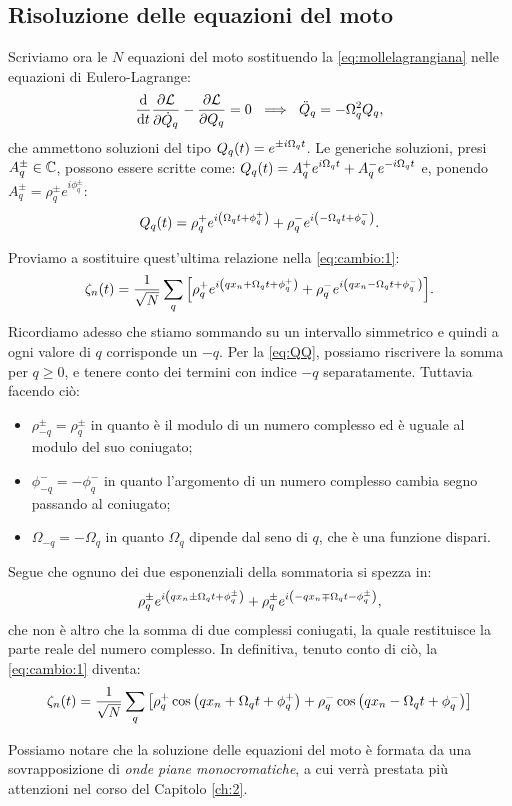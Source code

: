     \subsection{Risoluzione delle equazioni del moto}
        Scriviamo ora le $N$ equazioni del moto sostituendo la \eqref{eq:mollelagrangiana} nelle equazioni di Eulero-Lagrange:
            $$\lagrange{\LL}{Q_q}{\dot{Q}_q}=0\ \implies\ \ddot{Q}_q=-\Omega_q^2Q_q,$$
        che ammettono soluzioni del tipo $\displaystyle Q_q\qty(t)=e^{\pm i\Omega_qt}$. Le generiche soluzioni, presi $A_q^\pm\in\mathbb{C}$, possono essere scritte come: $\displaystyle Q_q\qty(t)=A_q^+e^{i\Omega_qt}+A_q^-e^{-i\Omega_qt}$ e, ponendo $\displaystyle A_q^\pm=\rho_q^\pm e^{i\phi_q^\pm}$:
            $$Q_q\qty(t)=\rho_q^+e^{i\qty(\Omega_qt+\phi_q^+)}+\rho_q^-e^{i\qty(-\Omega_qt+\phi_q^-)}.$$
        \par Proviamo a sostituire quest'ultima relazione nella \eqref{eq:cambio:1}:
            $$\zeta_n\qty(t)=\frac{1}{\sqrt{N}}\sum_q\qty[\rho_q^+e^{i\qty(qx_n+\Omega_qt+\phi_q^+)}+\rho_q^-e^{i\qty(qx_n-\Omega_qt+\phi_q^-)}].$$
        Ricordiamo adesso che stiamo sommando su un intervallo simmetrico e quindi a ogni valore di $q$ corrisponde un $-q$. Per la \eqref{eq:QQ}, possiamo riscrivere la somma per $q\geq 0$, e tenere conto dei termini con indice $-q$ separatamente. Tuttavia facendo ci\`o: 
        \begin{itemize}
            \item $\rho_{-q}^\pm=\rho_{q}^\pm$ in quanto \`e il modulo di un numero complesso ed \`e uguale al modulo del suo coniugato;
            \item $\phi_{-q}^-=-\phi_q^-$ in quanto l'argomento di un numero complesso cambia segno passando al coniugato;
            \item $\Omega_{-q}=-\Omega_q$ in quanto $\Omega_q$ dipende dal seno di $q$, che \`e una funzione dispari.
        \end{itemize}
        Segue che ognuno dei due esponenziali della sommatoria si spezza in:
            $$\rho_q^\pm e^{i\qty(qx_n\pm\Omega_qt+\phi_q^\pm)}+\rho_{q}^\pm e^{i\qty(-qx_n\mp\Omega_qt-\phi_{q}^\pm)},$$
        che non \`e altro che la somma di due complessi coniugati, la quale restituisce la parte reale del numero complesso. In definitiva, tenuto conto di ci\`o, la \eqref{eq:cambio:1} diventa:
        \begin{equation}
            \zeta_n\qty(t)=\frac{1}{\sqrt{N}}\sum_q\qty[\rho_q^+\cos\qty(qx_n+\Omega_qt+\phi_q^+)+\rho_q^-\cos\qty(qx_n-\Omega_qt+\phi_q^-)]
        \end{equation}
        \par Possiamo notare che la soluzione delle equazioni del moto \`e formata da una sovrapposizione di \emph{onde piane monocromatiche}, a cui verr\`a prestata pi\`u attenzioni nel corso del Capitolo \ref{ch:2}.
